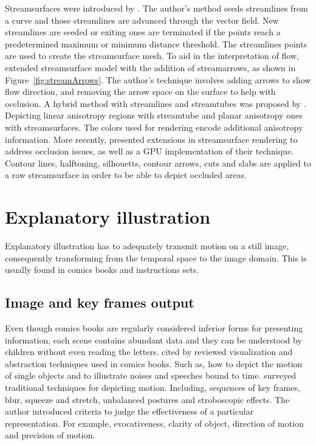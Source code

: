 Streamsurfaces were introduced by \cite{Hultquist1992}.
The author's method seeds streamlines from a curve and those streamlines are advanced through the vector field.
New streamlines are seeded or exiting ones are terminated if the points reach a predetermined maximum or minimum distance threshold.
The streamlines points are used to create the streamsurface mesh.
To aid in the interpretation of flow, \cite{Loffelmann1997} extended streamsurface model with the addition of streamarrows, as shown in Figure~\ref{fig:streamArrows}.
The author's technique involves adding arrows to show flow direction, and removing the arrow space on the surface to help with occlusion.
A hybrid method with streamlines and streamtubes was proposed by \cite{Zhang2003}.
Depicting linear anisotropy regions with streamtube and planar anisotropy ones with streamsurfaces.
The colors used for rendering encode additional anisotropy information.
More recently, \cite{Born2010} presented extensions in streamsurface rendering to address occlusion issues, as well as a GPU implementation of their technique.
Contour lines, halftoning, silhouetts, contour arrows, cuts and slabs are applied to a raw streamsurface in order to be able to depict occluded areas.


\section{Explanatory illustration}

Explanatory illustration has to adequately transmit motion on a still image, consequently transforming from the temporal space to the image domain.
This is usually found in comics books and instructions sets.

\subsection{Image and key frames output}

Even though comics books are regularly considered inferior forms for presenting information, each scene contains abundant data and they can be understood by children without even reading the letters.
\cite{McCloud1993} cited by \cite{Cutting2002} reviewed visualization and abstraction techniques used in comics books.
Such as, how to depict the motion of single objects and to illustrate noises and speeches bound to time.
\cite{Cutting2002} surveyed traditional techniques for depicting motion.
Including, sequences of key frames, blur, squeeze and stretch, unbalanced postures and stroboscopic effects.
The author introduced criteria to judge the effectiveness of a particular representation.
For example, evocativeness, clarity of object, direction of motion and precision of motion.

